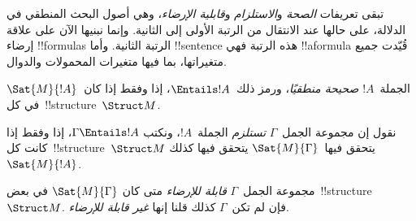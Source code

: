 \documentclass[../../../include/open-logic-section]{subfiles}
\begin{document}

\begin{explain}
تبقى تعريفات \emph{الصحة} و\emph{الاستلزام} و\emph{قابلية الإرضاء}،
وهي أصول البحث المنطقي في الدلالة، على حالها عند الانتقال من الرتبة
الأولى إلى الثانية. وإنما نبنيها الآن على علاقة إرضاء !!{formula}s
الرتبة الثانية. وأما !!{sentence} هذه الرتبة فهي
!!a{formula} قُيّدت جميع متغيراتها، بما فيها متغيرات المحمولات
والدوال.
\end{explain}

\begin{defn}[الصحة]
الجملة~$!A$ \emph{صحيحة منطقيًا}، ورمز ذلك~$\Entails !A$، إذا
وفقط إذا كان~$\Sat{M}{!A}$ في كل~!!{structure}~$\Struct M$.
\end{defn}

\begin{defn}[الاستلزام]
نقول إن مجموعة الجمل~$\Gamma$ \emph{تستلزم} الجملة~$!A$، ونكتب
$\Gamma \Entails !A$، إذا وفقط إذا كانت كل~!!{structure}~$\Struct M$
يتحقق فيها~$\Sat{M}{\Gamma}$ يتحقق فيها كذلك~$\Sat{M}{!A}$.
\end{defn}

\begin{defn}
مجموعة الجمل~$\Gamma$ \emph{قابلة للإرضاء} متى كان
$\Sat{M}{\Gamma}$ في بعض~!!{structure}~$\Struct M$.
فإن لم تكن~$\Gamma$ كذلك قلنا إنها \emph{غير قابلة للإرضاء}.
\end{defn}
\end{document}
